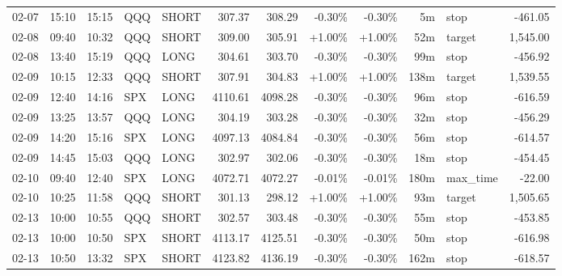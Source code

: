 \documentclass[11pt,a4paper,twoside]{article}
\begin{document}
\begin{center}
\begin{longtable}{>{\color{txtmain}}l l l l l r r r r r >{\color{txtmain}}l r}
02-07 & 15:10 & 15:15 & QQQ & SHORT & 307.37 & 308.29 & \textcolor{lossred}{-0.30\%} & \textcolor{lossred}{-0.30\%} & 5m & stop & \textcolor{lossred}{-461.05} \\
02-08 & 09:40 & 10:32 & QQQ & SHORT & 309.00 & 305.91 & \textcolor{wingreen}{+1.00\%} & \textcolor{wingreen}{+1.00\%} & 52m & target & \textcolor{wingreen}{1,545.00} \\
02-08 & 13:40 & 15:19 & QQQ & LONG & 304.61 & 303.70 & \textcolor{lossred}{-0.30\%} & \textcolor{lossred}{-0.30\%} & 99m & stop & \textcolor{lossred}{-456.92} \\
02-09 & 10:15 & 12:33 & QQQ & SHORT & 307.91 & 304.83 & \textcolor{wingreen}{+1.00\%} & \textcolor{wingreen}{+1.00\%} & 138m & target & \textcolor{wingreen}{1,539.55} \\
02-09 & 12:40 & 14:16 & SPX & LONG & 4110.61 & 4098.28 & \textcolor{lossred}{-0.30\%} & \textcolor{lossred}{-0.30\%} & 96m & stop & \textcolor{lossred}{-616.59} \\
02-09 & 13:25 & 13:57 & QQQ & LONG & 304.19 & 303.28 & \textcolor{lossred}{-0.30\%} & \textcolor{lossred}{-0.30\%} & 32m & stop & \textcolor{lossred}{-456.29} \\
02-09 & 14:20 & 15:16 & SPX & LONG & 4097.13 & 4084.84 & \textcolor{lossred}{-0.30\%} & \textcolor{lossred}{-0.30\%} & 56m & stop & \textcolor{lossred}{-614.57} \\
02-09 & 14:45 & 15:03 & QQQ & LONG & 302.97 & 302.06 & \textcolor{lossred}{-0.30\%} & \textcolor{lossred}{-0.30\%} & 18m & stop & \textcolor{lossred}{-454.45} \\
02-10 & 09:40 & 12:40 & SPX & LONG & 4072.71 & 4072.27 & \textcolor{lossred}{-0.01\%} & \textcolor{lossred}{-0.01\%} & 180m & max\_time & \textcolor{lossred}{-22.00} \\
02-10 & 10:25 & 11:58 & QQQ & SHORT & 301.13 & 298.12 & \textcolor{wingreen}{+1.00\%} & \textcolor{wingreen}{+1.00\%} & 93m & target & \textcolor{wingreen}{1,505.65} \\
02-13 & 10:00 & 10:55 & QQQ & SHORT & 302.57 & 303.48 & \textcolor{lossred}{-0.30\%} & \textcolor{lossred}{-0.30\%} & 55m & stop & \textcolor{lossred}{-453.85} \\
02-13 & 10:00 & 10:50 & SPX & SHORT & 4113.17 & 4125.51 & \textcolor{lossred}{-0.30\%} & \textcolor{lossred}{-0.30\%} & 50m & stop & \textcolor{lossred}{-616.98} \\
02-13 & 10:50 & 13:32 & SPX & SHORT & 4123.82 & 4136.19 & \textcolor{lossred}{-0.30\%} & \textcolor{lossred}{-0.30\%} & 162m & stop & \textcolor{lossred}{-618.57} \\

\end{longtable}
\end{center}
\end{document}
